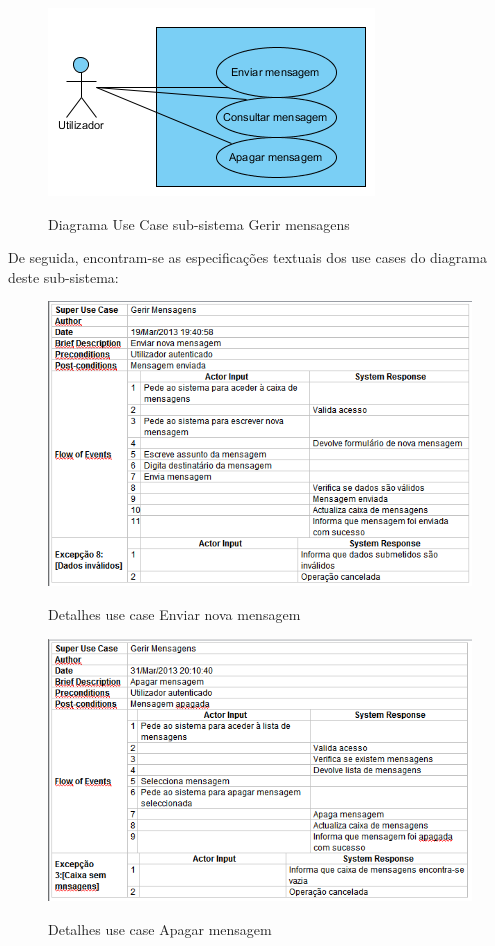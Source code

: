 \documentclass[12pt,a4paper]{article}
\begin{document}
\begin{figure}[h!]
\centering
\includegraphics[scale=1]{usecase/U_GerirMensagens}
\label{usecase}
\caption{Diagrama Use Case sub-sistema Gerir mensagens}
\end{figure}

De seguida, encontram-se as especificações textuais dos use cases do diagrama deste sub-sistema:\\

\begin{figure}[h!]
\centering
\includegraphics[scale=0.7]{d_usecase/enviarmensagem}
\label{usecase}
\caption{Detalhes use case Enviar nova mensagem}
\end{figure}

\begin{figure}[h!]
\centering
\includegraphics[scale=0.7]{d_usecase/apagarmensagem}
\label{usecase}
\caption{Detalhes use case Apagar mensagem}
\end{figure}
\end{document}
